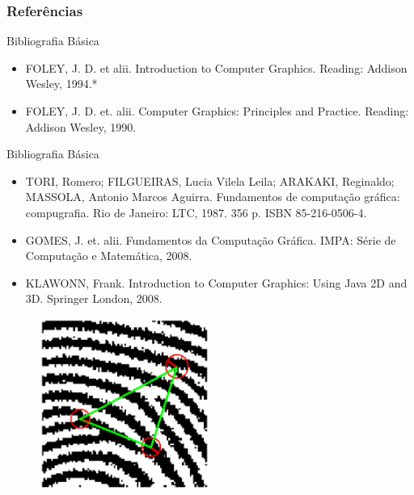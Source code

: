 \documentclass{beamer}
\begin{document}

\begin{frame}
\frametitle{Referências}
		\begin{block}{Bibliografia Básica}
			
			\begin{itemize}
				\item FOLEY, J. D. et alii. Introduction to Computer Graphics. Reading: Addison Wesley, 1994.*
				\item FOLEY, J. D. et. alii. Computer Graphics: Principles and Practice. Reading: Addison Wesley, 1990. 
			\end{itemize}

		\end{block}
		
		\begin{block}{Bibliografia Básica}
			
			\begin{itemize}
				\item TORI, Romero; FILGUEIRAS, Lucia Vilela Leila; ARAKAKI, Reginaldo; MASSOLA, Antonio Marcos Aguirra. Fundamentos de computação gráfica: compugrafia. Rio de Janeiro: LTC, 1987. 356 p. ISBN 85-216-0506-4.
				
				\item GOMES, J. et. alii. Fundamentos da Computação Gráfica. IMPA: Série de Computação e Matemática, 2008.
				
				\item KLAWONN, Frank. Introduction to Computer Graphics: Using Java 2D and 3D. Springer London, 2008. 
			\end{itemize}

		\end{block}

	\begin{figure}[!h]
		\begin{center}
			\includegraphics[width=0.5\textwidth]{Figures/semelhancas}
		\end{center}
		
	\end{figure}
	
\end{frame}
\end{document}
